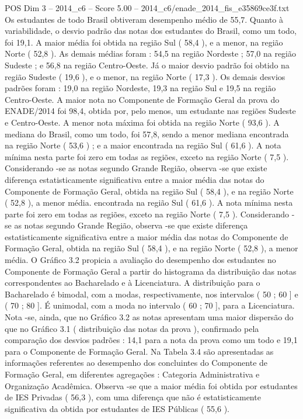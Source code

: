 \begin{textsample}{POS Dim 3 – 2014\_c6 – Score 5.00 – 2014\_c6/enade\_2014\_fis\_e35869ce3f.txt}
Os estudantes de todo Brasil obtiveram desempenho médio de 55,7.
Quanto à variabilidade, o desvio padrão das notas dos estudantes do Brasil, como um todo, foi 19,1.
A maior média foi obtida na região Sul ( 58,4 ), e a menor, na região Norte ( 52,8 ).
As demais médias foram : 54,5 na região Nordeste ; 57,0 na região Sudeste ; e 56,8 na região Centro-Oeste.
Já o maior desvio padrão foi obtido na região Sudeste ( 19,6 ), e o menor, na região Norte ( 17,3 ).
Os demais desvios padrões foram : 19,0 na região Nordeste, 19,3 na região Sul e 19,5 na região Centro-Oeste.
A maior nota no Componente de Formação Geral da prova do ENADE/2014 foi 98,4, obtida por, pelo menos, um estudante nas regiões Sudeste e Centro-Oeste.
A menor nota máxima foi obtida na região Norte ( 93,6 ).
A mediana do Brasil, como um todo, foi 57,8, sendo a menor mediana encontrada na região Norte ( 53,6 ) ; e a maior encontrada na região Sul ( 61,6 ).
A nota mínima nesta parte foi zero em todas as regiões, exceto na região Norte ( 7,5 ).
Considerando -se as notas segundo Grande Região, observa -se que existe diferença estatisticamente significativa entre a maior média das notas do Componente de Formação Geral, obtida na região Sul ( 58,4 ), e na região Norte ( 52,8 ), a menor média. encontrada na região Sul ( 61,6 ).
A nota mínima nesta parte foi zero em todas as regiões, exceto na região Norte ( 7,5 ).
Considerando -se as notas segundo Grande Região, observa -se que existe diferença estatisticamente significativa entre a maior média das notas do Componente de Formação Geral, obtida na região Sul ( 58,4 ), e na região Norte ( 52,8 ), a menor média.
O Gráfico 3.2 propicia a avaliação do desempenho dos estudantes no Componente de Formação Geral a partir do histograma da distribuição das notas correspondentes ao Bacharelado e à Licenciatura.
A distribuição para o Bacharelado é bimodal, com a modas, respectivamente, nos intervalos ( 50 ; 60 ] e ( 70 ; 80 ].
É unimodal, com a moda no intervalo ( 60 ; 70 ], para a Licenciatura.
Nota -se, ainda, que no Gráfico 3.2 as notas apresentam uma maior dispersão do que no Gráfico 3.1 ( distribuição das notas da prova ), confirmado pela comparação dos desvios padrões : 14,1 para a nota da prova como um todo e 19,1 para o Componente de Formação Geral.
Na Tabela 3.4 são apresentadas as informações referentes ao desempenho dos concluintes do Componente de Formação Geral, em diferentes agregações : Categoria Administrativa e Organização Acadêmica.
Observa -se que a maior média foi obtida por estudantes de IES Privadas ( 56,3 ), com uma diferença que não é estatisticamente significativa da obtida por estudantes de IES Públicas ( 55,6 ).

\end{textsample}
